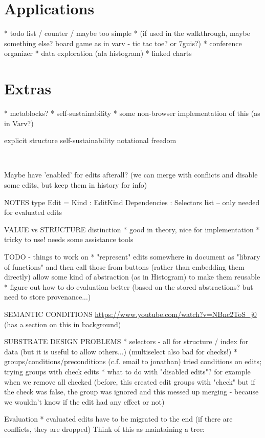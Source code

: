 \documentclass[sigconf,anonymous,screen]{acmart}
\begin{document}
\section{Applications}
* todo list / counter / maybe too simple
* (if used in the walkthrough, maybe something else? board game as in varv - tic tac toe? or 7guis?)
* conference organizer
* data exploration (ala histogram)
* linked charts

\section{Extras}
* metablocks?
* self-sustainability
* some non-browser implementation of this (as in Varv?)

explicit structure
self-sustainability
notational freedom

\newpage
~

Maybe have 'enabled' for edits afterall?
(we can merge with conflicts and disable some edits, but keep them in history for info)

NOTES
type Edit =
  { Kind : EditKind
    Dependencies : Selectors list }  -- only needed for evaluated edits

VALUE vs STRUCTURE distinction
* good in theory, nice for implementation
* tricky to use! needs some assistance tools

TODO - things to work on
* "represent" edits somewhere in document as "library of functions"
  and then call those from buttons (rather than embedding them directly)
  allow some kind of abstraction (as in Histogram) to make them reusable
* figure out how to do evaluation better
  (based on the stored abstractions? but need to store provenance...)

SEMANTIC CONDITIONS
\url{https://www.youtube.com/watch?v=NBnc2ToS_j0}
(has a section on this in background)

SUBSTRATE DESIGN PROBLEMS
* selectors - all for structure / index for data
  (but it is useful to allow others...)
  (multiselect also bad for checks!)
* groups/conditions/preconditions
  (c.f. email to jonathan)
  tried conditions on edits; trying groups with check edits
* what to do with "disabled edits"? for example when we remove all checked
  (before, this created edit groups with "check" but if the check was false,
  the group was ignored and this messed up merging - because we wouldn't know if the
  edit had any effect or not)

Evaluation
* evaluated edits have to be migrated to the end
  (if there are conflicts, they are dropped)
  Think of this as maintaining a tree:
\end{document}
